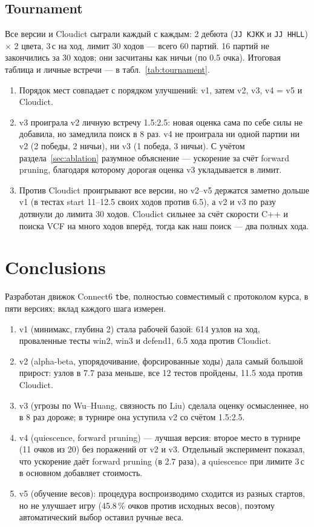 \documentclass[a4paper,10pt,twocolumn]{article}
\newenvironment{points}{\begin{enumerate}[label=(\arabic*),leftmargin=*,itemsep=2pt,topsep=3pt]}{\end{enumerate}}
\newcommand{\code}[1]{\texttt{#1}}
\begin{document}
\subsection{Tournament}
Все версии и Cloudict сыграли каждый с каждым: 2 дебюта (\code{JJ KJKK} и \code{JJ HHLL}) $\times$ 2 цвета, 3\,с на ход, лимит 30 ходов --- всего 60 партий. 16 партий не закончились за 30 ходов; они засчитаны как ничьи (по 0.5 очка). Итоговая таблица и личные встречи --- в табл.~\ref{tab:tournament}.
\begin{points}
\item Порядок мест совпадает с порядком улучшений: v1, затем v2, v3, v4 = v5 и Cloudict.
\item v3 проиграла v2 личную встречу 1.5:2.5: новая оценка сама по себе силы не добавила, но замедлила поиск в 8 раз. v4 не проиграла ни одной партии ни v2 (2 победы, 2 ничьи), ни v3 (1 победа, 3 ничьи). С учётом раздела~\ref{sec:ablation} разумное объяснение --- ускорение за счёт forward pruning, благодаря которому дорогая оценка v3 укладывается в лимит.
\item Против Cloudict проигрывают все версии, но v2--v5 держатся заметно дольше v1 (в тестах start 11--12.5 своих ходов против 6.5), а v2 и v3 по разу дотянули до лимита 30 ходов. Cloudict сильнее за счёт скорости C++ и поиска VCF на много ходов вперёд, тогда как наш поиск --- два полных хода.
\end{points}

\section{Conclusions}\label{sec:concl}

Разработан движок Connect6 \code{tbe}, полностью совместимый с протоколом курса, в пяти версиях; вклад каждого шага измерен.
\begin{points}
\item v1 (минимакс, глубина 2) стала рабочей базой: 614 узлов на ход, проваленные тесты win2, win3 и defend1, 6.5 хода против Cloudict.
\item v2 (alpha-beta, упорядочивание, форсированные ходы) дала самый большой прирост: узлов в 7.7 раза меньше, все 12 тестов пройдены, 11.5 хода против Cloudict.
\item v3 (угрозы по Wu--Huang, связность по Liu) сделала оценку осмысленнее, но в 8 раз дороже; в турнире она уступила v2 со счётом 1.5:2.5.
\item v4 (quiescence, forward pruning) --- лучшая версия: второе место в турнире (11 очков из 20) без поражений от v2 и v3. Отдельный эксперимент показал, что ускорение даёт forward pruning (в 2.7 раза), а quiescence при лимите 3\,с в основном добавляет стоимость.
\item v5 (обучение весов): процедура воспроизводимо сходится из разных стартов, но не улучшает игру (45.8\,\% очков против исходных весов), поэтому автоматический выбор оставил ручные веса.
\end{points}
\end{document}
